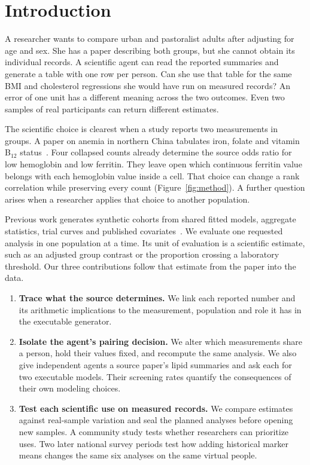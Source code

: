 \documentclass[sigconf,anonymous,review]{acmart}
\begin{document}
\section{Introduction}
A researcher wants to compare urban and pastoralist adults after adjusting for age and sex. She has a paper describing both groups, but she cannot obtain its individual records. A scientific agent can read the reported summaries and generate a table with one row per person. Can she use that table for the same BMI and cholesterol regressions she would have run on measured records? An error of one unit has a different meaning across the two outcomes. Even two samples of real participants can return different estimates.

The scientific choice is clearest when a study reports two measurements in groups. A paper on anemia in northern China tabulates iron, folate and vitamin B$_{12}$ status~\cite{zhu}. Four collapsed counts already determine the source odds ratio for low hemoglobin and low ferritin. They leave open which continuous ferritin value belongs with each hemoglobin value inside a cell. That choice can change a rank correlation while preserving every count (Figure~\ref{fig:method}). A further question arises when a researcher applies that choice to another population.

Previous work generates synthetic cohorts from shared fitted models, aggregate statistics, trial curves and published covariates~\cite{filshtein,llmsynthor,synthipd,kmgen}. We evaluate one requested analysis in one population at a time. Its unit of evaluation is a scientific estimate, such as an adjusted group contrast or the proportion crossing a laboratory threshold. Our three contributions follow that estimate from the paper into the data.
\begin{enumerate}
\item \textbf{Trace what the source determines.} We link each reported number and its arithmetic implications to the measurement, population and role it has in the executable generator.
\item \textbf{Isolate the agent's pairing decision.} We alter which measurements share a person, hold their values fixed, and recompute the same analysis. We also give independent agents a source paper's lipid summaries and ask each for two executable models. Their screening rates quantify the consequences of their own modeling choices.
\item \textbf{Test each scientific use on measured records.} We compare estimates against real-sample variation and seal the planned analyses before opening new samples. A community study tests whether researchers can prioritize uses. Two later national survey periods test how adding historical marker means changes the same six analyses on the same virtual people.
\end{enumerate}
\end{document}
